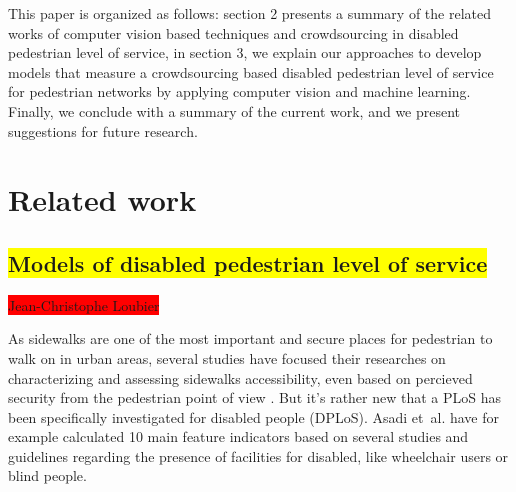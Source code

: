 \documentclass[10pt,conference,a4paper]{IEEEtran}
\begin{document}
This paper is organized as follows: section 2 presents a summary of the related works of computer vision based techniques and crowdsourcing in disabled pedestrian level of service, in section 3, we explain our approaches to develop models that measure a crowdsourcing based disabled pedestrian level of service for pedestrian networks by applying computer vision and machine learning. Finally, we conclude with a summary of the current work, and we present suggestions for future research.



\section{Related work}

\subsection{\colorbox{yellow}{Models of disabled pedestrian level of service}}
\colorbox{red}{Jean-Christophe Loubier}


As sidewalks are one of the most important and secure places for pedestrian to walk on in urban areas, several studies have focused their researches on characterizing and assessing sidewalks accessibility, even based on percieved security from the pedestrian point of view \cite{tan_research_2007}. 
But it's rather new that a PLoS has been specifically investigated for disabled people (DPLoS). Asadi et~al. \cite{asadi-shekari_zohreh_disabled_2013} have for example calculated 10 main feature indicators based on several studies and guidelines regarding the presence of facilities for disabled, like wheelchair users or blind people. 
\end{document}
